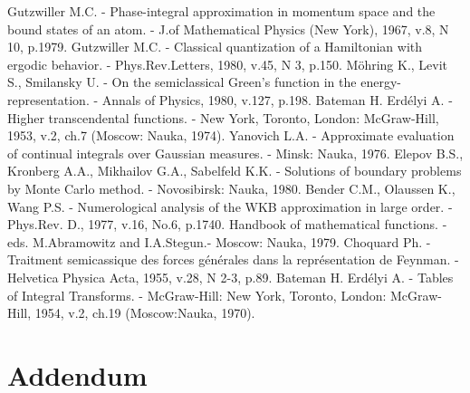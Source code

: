 \documentclass[11pt]{article}
\begin{document}
\begin{thebibliography}{99}
 Gutzwiller M.C. - Phase-integral approximation in momentum space 
             and the bound states of an atom. - 
             J.of Mathematical Physics (New York), 1967, v.8, N 10, p.1979.
 Gutzwiller M.C. - Classical quantization of a Hamiltonian with 
             ergodic behavior. - Phys.Rev.Letters, 1980, v.45, N 3, p.150.
 M\"{o}hring K., Levit S., Smilansky U. -  On the semiclassical Green's
             function in the energy-representation. - Annals of Physics, 1980,                    v.127, p.198.
 Bateman H. Erd\'elyi A. - Higher transcendental functions. -
             New York, Toronto, London: McGraw-Hill,  1953, v.2, ch.7
             (Moscow: Nauka, 1974).
 Yanovich L.A. - Approximate evaluation of continual integrals over
    Gaussian measures. -  Minsk: Nauka, 1976.
 Elepov B.S., Kronberg A.A., Mikhailov G.A., Sabelfeld K.K. -  
             Solutions of boundary problems by Monte Carlo method. - 
             Novosibirsk: Nauka, 1980.
 Bender C.M., Olaussen K., Wang P.S. - Numerological analysis of the
             WKB approximation in large order. - 
             Phys.Rev. D., 1977, v.16, No.6, p.1740.
 Handbook of mathematical functions. - eds. M.Abramowitz 
             and I.A.Stegun.- Moscow:  Nauka, 1979.
 Choquard Ph.  - Traitment semicassique des forces g\'{e}n\'{e}rales
             dans la repr\'{e}sentation de Feynman. -  Helvetica Physica Acta, 1955,
             v.28, N 2-3, p.89.
 Bateman H. Erd\'elyi A. - Tables of Integral
             Transforms. - McGraw-Hill: New York, Toronto, London: McGraw-Hill, 1954,
             v.2, ch.19  (Moscow:Nauka, 1970).

\end{thebibliography}


\section*{Addendum}
\end{document}
